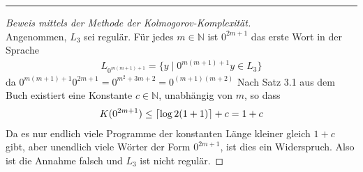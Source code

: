\documentclass[a4paper,ngerman,12pt]{exam}
\DeclarePairedDelimiter\ceil{\lceil}{\rceil}
\begin{document}
\begin{questions}
\begin{parts}
\begin{solutionorbox}
      \hrule

      \begin{proof}[Beweis mittels der Methode der Kolmogorov-Komplexität] $ $\\
        Angenommen, $L_3$ sei regulär. Für jedes $m \in \mathbb{N}$ ist $0^{2m+1}$
  das erste Wort in der Sprache
  \begin{align*}
    L_{0^{m(m+1)+1}} = \{y \mid 0^{m(m+1)+1}y \in L_3\}
  \end{align*}
        da $0^{m(m+1) + 1} 0^{2m+1} = 0^{m^2+ 3m + 2} = 0^{(m+1)(m+2)}$
Nach Satz 3.1 aus dem Buch existiert eine Konstante $c \in \mathbb{N}$,
unabhängig von $m$, so dass
  \begin{align*}
    K(0^{2m+1}) \leq \ceil{\log 2 (1 + 1)} + c = 1 + c
  \end{align*}
Da es nur endlich viele Programme der
konstanten Länge kleiner gleich $1 + c$ gibt, aber unendlich
viele Wörter der Form $0^{2m+1}$, ist dies ein Widerspruch. Also ist die Annahme falsch
und $L_3$ ist nicht regulär.
      \end{proof}
\end{solutionorbox}
  \end{parts}

  \question
\end{questions}
\end{document}
